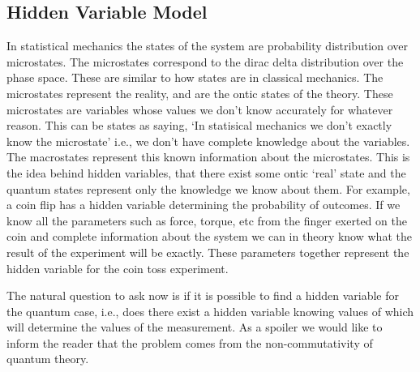 \documentclass[11pt]{report}
\begin{document}
\subsection{Hidden Variable Model}
In statistical mechanics the states of the system are probability distribution over microstates. The microstates correspond to the dirac delta distribution over the phase space. These are similar to how states are in classical mechanics. The microstates represent the reality, and are the ontic states of the theory. These microstates are variables whose values we don't know accurately for whatever reason. This can be states as saying, `In statisical mechanics we don't exactly know the microstate' i.e., we don't have complete knowledge about the variables. The macrostates represent this known information about the microstates. This is the idea behind hidden variables, that there exist some ontic `real' state and the quantum states represent only the knowledge we know about them. For example, a coin flip has a hidden variable determining the probability of outcomes. If we know all the parameters such as force, torque, etc from the finger exerted on the coin and complete information about the system we can in theory know what the result of the experiment will be exactly. These parameters together represent the hidden variable for the coin toss experiment. 

The natural question to ask now is if it is possible to find a hidden variable for the quantum case, i.e., does there exist a hidden variable knowing values of which will determine the values of the measurement. As a spoiler we would like to inform the reader that the problem comes from the non-commutativity of quantum theory.
\end{document}
